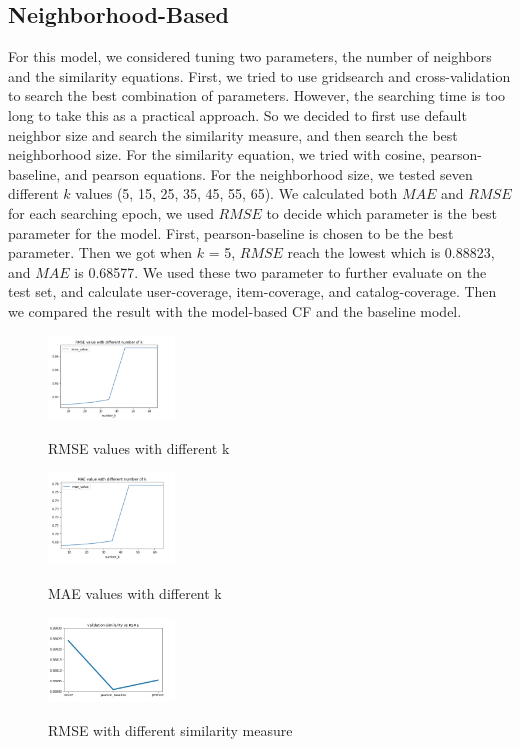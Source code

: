 \documentclass[12pt,journal,compsoc]{IEEEtran}
\begin{document}
\subsection{Neighborhood-Based}
For this model, we considered tuning two parameters, the number of neighbors and the similarity equations. First, we tried to use gridsearch and cross-validation to search the best combination of parameters. However, the searching time is too long to take this as a practical approach. So we decided to first use default neighbor size and search the similarity measure, and then search the best neighborhood size. For the similarity equation, we tried with cosine, pearson-baseline, and pearson equations. For the neighborhood size, we tested seven different $k$ values (5, 15, 25, 35, 45, 55, 65). We calculated both $MAE$ and $RMSE$ for each searching epoch, we used $RMSE$ to decide which parameter is the best parameter for the model. First, pearson-baseline is chosen to be the best parameter. Then we got when $k$ = 5, $RMSE$ reach the lowest which is 0.88823, and $MAE$ is 0.68577. We used these two parameter to further evaluate on the test set, and calculate user-coverage, item-coverage, and catalog-coverage. Then we compared the result with the model-based CF and the baseline model.

\begin{figure}[H]
\centering
\caption{RMSE values with different k}
\includegraphics[width=0.30\textwidth]{img/RMSEk.png}
\label{fig_sim}
\end{figure}

\begin{figure}[H]
\centering
\caption{MAE values with different k}
\includegraphics[width=0.30\textwidth]{img/MAEk.png}
\label{fig_sim}
\end{figure}


\begin{figure}[H]
\centering
\caption{RMSE with different similarity measure}
\includegraphics[width=0.30\textwidth]{img/validation-similarity_vs_RSME.jpg}
\label{fig_sim}
\end{figure}
\end{document}
